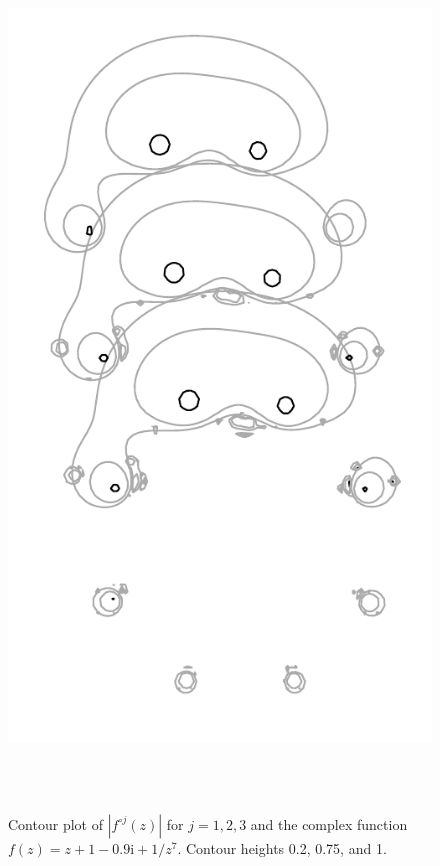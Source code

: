 \documentclass[12pt, a4paper]{amsart}
\newcommand{\mi}{\text{i}}  %
\begin{document}
\begin{figure}[!ht]
\includegraphics[height=230mm]{images/three_monkeys.pdf}
\caption{
Contour plot of $|f^{\circ j}(z)|$ for $j = 1, 2, 3$ and the complex function $f(z) = z + 1 -0.9\mi + 1/z^7$.
Contour heights 0.2, 0.75, and 1.
}
\end{figure}
\pagebreak
\end{document}
